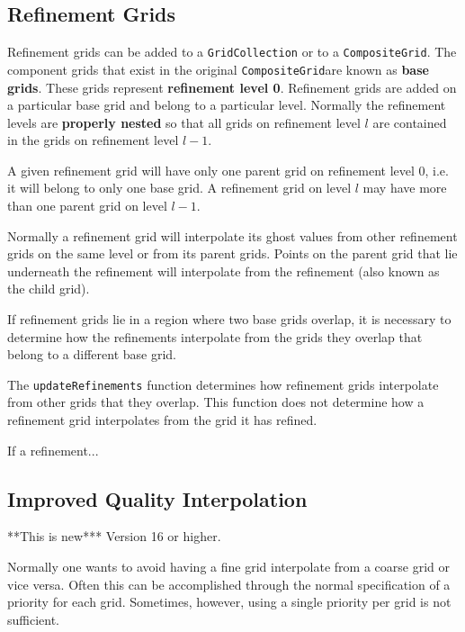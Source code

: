 \newcommand{\CompositeGrid}{{\tt CompositeGrid}}

\vfill\eject
\subsection{Refinement Grids}

Refinement grids can be added to a {\tt GridCollection} or to a
\CompositeGrid.  The component grids that exist in the original
\CompositeGrid are known as {\bf base grids}.  These grids represent
{\bf refinement level 0}. Refinement grids are added on a particular
base grid and belong to a particular level. Normally the refinement
levels are {\bf properly nested} so that all grids on refinement level
$l$ are contained in the grids on refinement level $l-1$.

A given refinement grid will have only one parent grid on refinement
level 0, i.e. it will belong to only one base grid. A refinement grid
on level $l$ may have more than one parent grid on level $l-1$.

Normally a refinement grid will interpolate its ghost values from
other refinement grids on the same level or from its parent
grids. Points on the parent grid that lie underneath the refinement
will interpolate from the refinement (also known as the child grid).


If refinement grids lie in a region where two base grids overlap, it
is necessary to determine how the refinements interpolate from the
grids they overlap that belong to a different base grid. 

The {\tt updateRefinements} function determines how refinement grids
interpolate from other grids that they overlap. This function does not
determine how a refinement grid interpolates from the grid it has
refined.

If a refinement...

\vfill\eject
\subsection{Improved Quality Interpolation}

**This is new*** Version 16 or higher.

Normally one wants to avoid having a fine grid interpolate from a coarse
grid or vice versa. Often this can be accomplished through the normal
specification of a priority for each grid. Sometimes, however, using
a single priority per grid is not sufficient.

